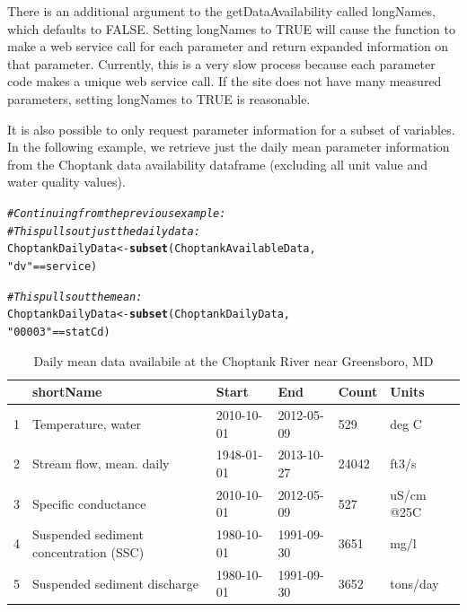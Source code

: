 \documentclass[a4paper,11pt]{article}\usepackage[]{graphicx}\usepackage[]{color}
\makeatletter
\newcommand{\hlstr}[1]{\textcolor[rgb]{0.192,0.494,0.8}{#1}}%
\newcommand{\hlcom}[1]{\textcolor[rgb]{0.678,0.584,0.686}{\textit{#1}}}%
\newcommand{\hlopt}[1]{\textcolor[rgb]{0,0,0}{#1}}%
\newcommand{\hlstd}[1]{\textcolor[rgb]{0.345,0.345,0.345}{#1}}%
\newcommand{\hlkwb}[1]{\textcolor[rgb]{0.69,0.353,0.396}{#1}}%
\newcommand{\hlkwd}[1]{\textcolor[rgb]{0.737,0.353,0.396}{\textbf{#1}}}%
\newenvironment{kframe}{%
 \def\at@end@of@kframe{}%
 \ifinner\ifhmode%
  \def\at@end@of@kframe{\end{minipage}}%
  \begin{minipage}{\columnwidth}%
 \fi\fi%
 \def\FrameCommand##1{\hskip\@totalleftmargin \hskip-\fboxsep
 \colorbox{shadecolor}{##1}\hskip-\fboxsep
     \hskip-\linewidth \hskip-\@totalleftmargin \hskip\columnwidth}%
 \MakeFramed {\advance\hsize-\width
   \@totalleftmargin\z@ \linewidth\hsize
   \@setminipage}}%
 {\par\unskip\endMakeFramed%
 \at@end@of@kframe}
\newenvironment{knitrout}{}{} %
\makeatother
\begin{document}
There is an additional argument to the getDataAvailability called longNames, which defaults to FALSE. Setting longNames to TRUE will cause the function to make a web service call for each parameter and return expanded information on that parameter. Currently, this is a very slow process because each parameter code makes a unique web service call. If the site does not have many measured parameters, setting longNames to TRUE is reasonable.

It is also possible to only request parameter information for a subset of variables. In the following example, we retrieve just the daily mean parameter information from the Choptank data availability dataframe (excluding all unit value and water quality values).


\begin{knitrout}
\color{fgcolor}\begin{kframe}
\begin{alltt}
\hlcom{# Continuing from the previous example:}
\hlcom{# This pulls out just the daily data:}
\hlstd{ChoptankDailyData} \hlkwb{<-} \hlkwd{subset}\hlstd{(ChoptankAvailableData,}
                            \hlstr{"dv"} \hlopt{==} \hlstd{service)}

\hlcom{# This pulls out the mean:}
\hlstd{ChoptankDailyData} \hlkwb{<-} \hlkwd{subset}\hlstd{(ChoptankDailyData,}
                            \hlstr{"00003"} \hlopt{==} \hlstd{statCd)}
\end{alltt}
\end{kframe}
\end{knitrout}


\begin{table}[ht]
\centering
\begin{tabular}{rlllll}
  \hline
 & shortName & Start & End & Count & Units \\ 
  \hline
1 & Temperature, water & 2010-10-01 & 2012-05-09 & 529 & deg C \\ 
  2 & Stream flow, mean. daily & 1948-01-01 & 2013-10-27 & 24042 & ft3/s \\ 
  3 & Specific conductance & 2010-10-01 & 2012-05-09 & 527 & uS/cm @25C \\ 
  4 & Suspended sediment concentration (SSC) & 1980-10-01 & 1991-09-30 & 3651 & mg/l \\ 
  5 & Suspended sediment discharge & 1980-10-01 & 1991-09-30 & 3652 & tons/day \\ 
   \hline
\end{tabular}
\caption{Daily mean data availabile at the Choptank River near Greensboro, MD} 
\label{tab:gda}
\end{table}
\end{document}
